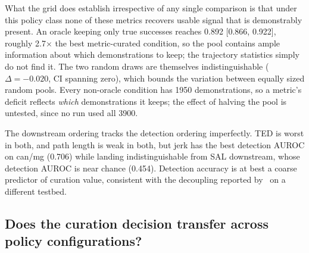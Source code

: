 \documentclass{article}
\begin{document}
What the grid does establish irrespective of any single comparison is that
under this policy class none of these metrics recovers usable signal that is
demonstrably present.
An oracle keeping only true successes reaches 0.892 [0.866, 0.922], roughly
2.7$\times$ the best metric-curated condition, so the pool contains ample
information about which demonstrations to keep; the trajectory statistics
simply do not find it. The two random draws are themselves indistinguishable
($\Delta = -0.020$, CI spanning zero), which bounds the variation between
equally sized random pools. Every non-oracle condition has 1950
demonstrations, so a metric's deficit reflects \emph{which} demonstrations
it keeps; the effect of halving the pool is untested, since no run used all
3900.

The downstream ordering tracks the detection ordering imperfectly. TED is
worst in both, and path length is weak in both, but jerk has the best
detection AUROC on can/mg (0.706) while landing indistinguishable from SAL
downstream, whose detection AUROC is near chance (0.454). Detection accuracy
is at best a coarse predictor of curation value, consistent with the
decoupling reported by~\citep{bedi-policy} on a different testbed.

\subsection{Does the curation decision transfer across policy configurations?}
\label{sec:crossarch}
\end{document}
